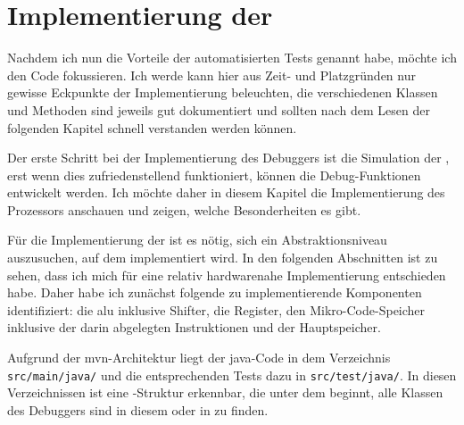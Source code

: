 \chapter{Implementierung der \mic}
Nachdem ich nun die Vorteile der automatisierten Tests genannt habe, möchte ich den Code fokussieren. Ich werde kann hier aus Zeit- und Platzgründen nur gewisse Eckpunkte der Implementierung beleuchten, die verschiedenen Klassen und Methoden sind jeweils gut dokumentiert und sollten nach dem Lesen der folgenden Kapitel schnell verstanden werden können.

Der erste Schritt bei der Implementierung des Debuggers ist die Simulation der \mic, erst wenn dies zufriedenstellend funktioniert, können die Debug-Funktionen entwickelt werden. Ich möchte daher in diesem Kapitel die Implementierung des Prozessors anschauen und zeigen, welche Besonderheiten es gibt.

Für die Implementierung der \mic ist es nötig, sich ein Abstraktionsniveau auszusuchen, auf dem implementiert wird. In den folgenden Abschnitten ist zu sehen, dass ich mich für eine relativ hardwarenahe Implementierung entschieden habe. Daher habe ich zunächst folgende zu implementierende Komponenten identifiziert: die \gls{alu} inklusive Shifter, die Register, den Mikro-Code-Speicher inklusive der darin abgelegten Instruktionen und der Hauptspeicher.

Aufgrund der \gls{mvn}-Architektur liegt der \gls{java}-Code in dem Verzeichnis \texttt{src/main/java/} und die entsprechenden Tests dazu in \texttt{src/test/java/}. In diesen Verzeichnissen ist eine \package-Struktur erkennbar, die unter dem \package {} beginnt, alle Klassen des Debuggers sind in diesem \package oder in \subpackages zu finden.

